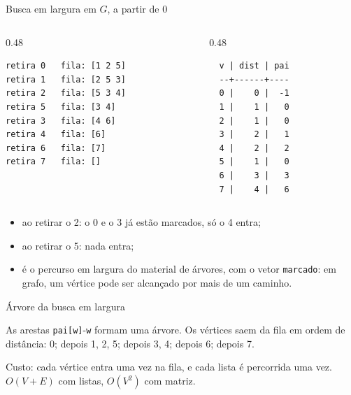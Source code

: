 \documentclass{beamer}
\begin{document}
\begin{frame}[fragile]{Busca em largura em $G$, a partir de 0}
	\begin{columns}[T]
		\begin{column}{0.48\textwidth}
			\begin{verbatim}
retira 0   fila: [1 2 5]
retira 1   fila: [2 5 3]
retira 2   fila: [5 3 4]
retira 5   fila: [3 4]
retira 3   fila: [4 6]
retira 4   fila: [6]
retira 6   fila: [7]
retira 7   fila: []
\end{verbatim}
		\end{column}
		\begin{column}{0.48\textwidth}
			\begin{verbatim}
  v | dist | pai
  --+------+----
  0 |    0 |  -1
  1 |    1 |   0
  2 |    1 |   0
  3 |    2 |   1
  4 |    2 |   2
  5 |    1 |   0
  6 |    3 |   3
  7 |    4 |   6
\end{verbatim}
		\end{column}
	\end{columns}

	\begin{itemize}
		\item ao retirar o 2: o 0 e o 3 já estão marcados, só o 4 entra;
		\item ao retirar o 5: nada entra;
		\item é o percurso em largura do material de árvores, com o vetor
		      \texttt{marcado}: em grafo, um vértice pode ser alcançado por mais de
		      um caminho.
	\end{itemize}
\end{frame}

\begin{frame}{Árvore da busca em largura}
	\begin{center}
		\scalebox{0.9}{\grafoGbfs}
	\end{center}

	As arestas \texttt{pai[w]}-\texttt{w} formam uma árvore. Os vértices saem
	da fila em ordem de distância: 0; depois 1, 2, 5; depois 3, 4; depois 6;
	depois 7.

	\vspace{0.2cm}
	Custo: cada vértice entra uma vez na fila, e cada lista é percorrida uma
	vez. $O(V + E)$ com listas, $O(V^2)$ com matriz.
\end{frame}
\end{document}
